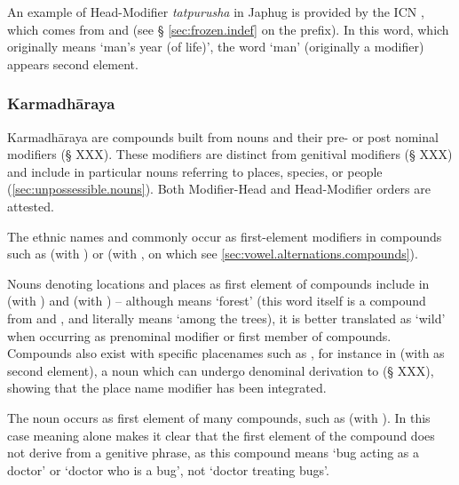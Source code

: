 An example of Head-Modifier \textit{tatpurusha} in Japhug is provided by the ICN , which comes from  and    (see § \ref{sec:frozen.indef} on the  prefix). In this word, which originally means `man's year (of life)', the word `man' (originally a modifier) appears second element.

\subsubsection{Karmadhāraya}  \label{sec:karmadharaya.n.n}

Karmadhāraya are compounds built from nouns and their pre- or post nominal modifiers (§ XXX). These modifiers are distinct from genitival modifiers (§ XXX) and include in particular nouns referring to places, species, or people (\ref{sec:unpossessible.nouns}).  Both Modifier-Head and Head-Modifier orders are attested.


The ethnic names  and  commonly occur as first-element modifiers in compounds such as  (with ) or (with , on which see \ref{sec:vowel.alternations.compounds}). 

Nouns denoting locations and places as first element of compounds include  in  (with ) and  (with ) -- although  means `forest' (this word itself is a compound from  and , and literally means `among the trees), it is better translated as `wild' when occurring as prenominal modifier or first member of compounds. Compounds also exist with specific placenames such as , for instance in  (with   as second element), a noun which can undergo denominal derivation to   (§ XXX), showing that the place name modifier has been integrated.

The noun  occurs as first element of many compounds, such as  (with ). In this case meaning alone makes it clear that the  first element of the compound does not derive from a genitive phrase, as this compound means `bug acting as a doctor' or `doctor who is a bug', not `doctor treating bugs'.

